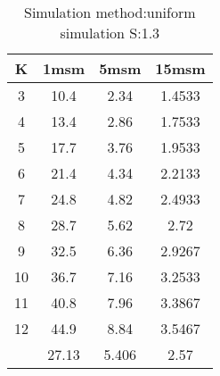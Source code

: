 \begin{table}[H]
\centering
\begin{tabular}{c|ccc}
K &1msm &5msm &15msm\\
\hline
3 & 10.4 & 2.34 & 1.4533\\
4 & 13.4 & 2.86 & 1.7533\\
5 & 17.7 & 3.76 & 1.9533\\
6 & 21.4 & 4.34 & 2.2133\\
7 & 24.8 & 4.82 & 2.4933\\
8 & 28.7 & 5.62 & 2.72\\
9 & 32.5 & 6.36 & 2.9267\\
10 & 36.7 & 7.16 & 3.2533\\
11 & 40.8 & 7.96 & 3.3867\\
12 & 44.9 & 8.84 & 3.5467\\
\hline
& 27.13 & 5.406 & 2.57\\
\end{tabular}
\caption{Simulation method:uniform simulation S:1.3}
\label{tab:s1.3}
\end{table}
